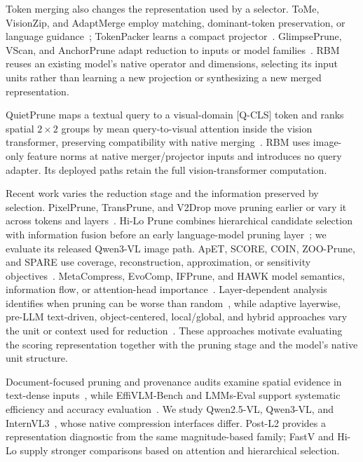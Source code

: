 \documentclass[10pt,twocolumn,letterpaper]{article}
\begin{document}
Token merging also changes the representation used by a selector. ToMe, VisionZip, and AdaptMerge employ matching, dominant-token preservation, or language guidance~\cite{bolya2023tome,yang2024visionzip,islam2025adaptmerge}; TokenPacker learns a compact projector~\cite{li2024tokenpacker}. GlimpsePrune, VScan, and AnchorPrune adapt reduction to inputs or model families~\cite{zeng2025glimpseprune,zhang2025vscan,oh2026anchorprune}. RBM reuses an existing model's native operator and dimensions, selecting its input units rather than learning a new projection or synthesizing a new merged representation.

QuietPrune maps a textual query to a visual-domain [Q-CLS] token and ranks spatial $2\times2$ groups by mean query-to-visual attention inside the vision transformer, preserving compatibility with native merging~\cite{gao2026quietprune}. RBM uses image-only feature norms at native merger/projector inputs and introduces no query adapter. Its deployed paths retain the full vision-transformer computation.

Recent work varies the reduction stage and the information preserved by selection. PixelPrune, TransPrune, and V2Drop move pruning earlier or vary it across tokens and layers~\cite{wang2026pixelprune,li2026transprune,chen2026v2drop}. Hi-Lo Prune combines hierarchical candidate selection with information fusion before an early language-model pruning layer~\cite{sun2026hiloprune}; we evaluate its released Qwen3-VL image path. ApET, SCORE, COIN, ZOO-Prune, and SPARE use coverage, reconstruction, approximation, or sensitivity objectives~\cite{ma2026apet,xu2026score,du2026coin,kim2026zooprune,lee2026spare}. MetaCompress, EvoComp, IFPrune, and HAWK model semantics, information flow, or attention-head importance~\cite{wang2026metacompress,song2026evocomp,sun2026ifprune,zhu2026hawk}. Layer-dependent analysis identifies when pruning can be worse than random~\cite{wang2026informationhorizon}, while adaptive layerwise, pre-LLM text-driven, object-centered, local/global, and hybrid approaches vary the unit or context used for reduction~\cite{chen2026alvts,li2026crisp,lei2026core,li2026aot,zhang2026hybrid}. These approaches motivate evaluating the scoring representation together with the pruning stage and the model's native unit structure.

Document-focused pruning and provenance audits examine spatial evidence in text-dense inputs~\cite{choi2026docprune,liu2026provenance}, while EffiVLM-Bench and LMMs-Eval support systematic efficiency and accuracy evaluation~\cite{wang2025effivlmbench,zhang2024lmmseval}. We study Qwen2.5-VL, Qwen3-VL, and InternVL3~\cite{bai2025qwen25vl,bai2025qwen3vl,zhu2025internvl3}, whose native compression interfaces differ. Post-L2 provides a representation diagnostic from the same magnitude-based family; FastV and Hi-Lo supply stronger comparisons based on attention and hierarchical selection.
\end{document}
